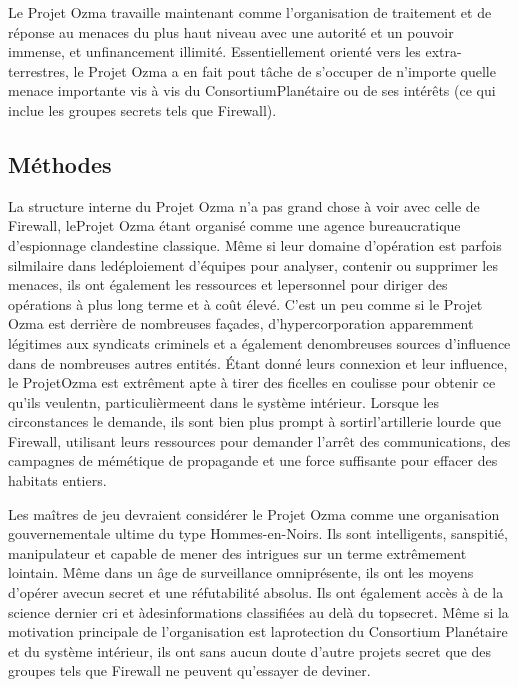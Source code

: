 {Le Projet Ozma travaille maintenant comme l'organisation de traitement et de réponse au menaces du plus haut niveau avec une autorité et un pouvoir immense, et unfinancement illimité. Essentiellement orienté vers les extra-terrestres, le Projet Ozma a en fait pout tâche de s'occuper de n'importe quelle menace importante vis à vis du ConsortiumPlanétaire ou de ses intérêts (ce qui inclue les groupes secrets tels que Firewall). 

\subsection{Méthodes} 

La structure interne du Projet Ozma n'a pas grand chose à voir avec celle de Firewall, leProjet Ozma étant organisé comme une agence bureaucratique d'espionnage clandestine classique. Même si leur domaine d'opération est parfois silmilaire dans ledéploiement d'équipes pour analyser, contenir ou supprimer les menaces, ils ont également les ressources et lepersonnel pour diriger des opérations à plus long terme et à coût élevé. C'est un peu comme si le Projet Ozma est derrière de nombreuses façades, d'hypercorporation apparemment légitimes aux syndicats criminels et a également denombreuses sources d'influence dans de nombreuses autres entités. Étant donné leurs connexion et leur influence, le ProjetOzma est extrêment apte à tirer des ficelles en coulisse pour obtenir ce qu'ils veulentn, particulièrmeent dans le système intérieur. Lorsque les circonstances le demande, ils sont bien plus prompt à sortirl'artillerie lourde que Firewall, utilisant leurs ressources pour demander l'arrêt des communications, des campagnes de mémétique de propagande et une force suffisante pour effacer des habitats entiers. 

Les maîtres de jeu devraient considérer le Projet Ozma comme une organisation gouvernementale ultime du type Hommes-en-Noirs. Ils sont intelligents, sanspitié, manipulateur et capable de mener des intrigues sur un terme extrêmement lointain. Même dans un âge de surveillance omniprésente, ils ont les moyens d'opérer avecun secret et une réfutabilité absolus. Ils ont également accès à de la science dernier cri et àdesinformations classifiées au delà du topsecret. Même si la motivation principale de l'organisation est laprotection du Consortium Planétaire et du système intérieur, ils ont sans aucun doute d'autre projets secret que des groupes tels que Firewall ne peuvent qu'essayer de deviner. 

}
